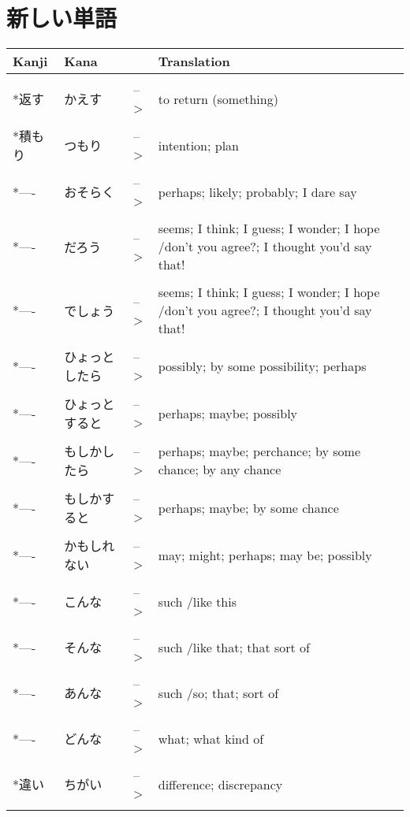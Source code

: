 \documentclass{article}
\begin{document}
\part*{新しい単語}
\begin{tabular}{ l | l l p{13cm} }
Kanji&Kana&&Translation\\ \hline\\[-1em]
*返す&かえす&-->& to return (something)\\ \hline\\[-1em]
*積もり&つもり&-->& intention; plan \\ \hline\\[-1em]
*----&おそらく&-->& perhaps; likely; probably; I dare say \\ \hline\\[-1em]
*----&だろう&-->& seems; I think; I guess; I wonder; I hope /don't you agree?; I thought you'd say that! \\ \hline\\[-1em]
*----&でしょう&-->& seems; I think; I guess; I wonder; I hope /don't you agree?; I thought you'd say that! \\ \hline\\[-1em]
*----&ひょっとしたら&-->& possibly; by some possibility; perhaps \\ \hline\\[-1em]
*----&ひょっとすると&-->& perhaps; maybe; possibly \\ \hline\\[-1em]
*----&もしかしたら&-->& perhaps; maybe; perchance; by some chance; by any chance \\ \hline\\[-1em]
*----&もしかすると&-->& perhaps; maybe; by some chance \\ \hline\\[-1em]
*----&かもしれない&-->& may; might; perhaps; may be; possibly \\ \hline\\[-1em]
*----&こんな&-->& such /like this \\ \hline\\[-1em]
*----&そんな&-->& such /like that; that sort of \\ \hline\\[-1em]
*----&あんな&-->& such /so; that; sort of \\ \hline\\[-1em]
*----&どんな&-->& what; what kind of \\ \hline\\[-1em]
*違い&ちがい&-->& difference; discrepancy \\ \hline\\[-1em]

\end{tabular}
\end{document}
